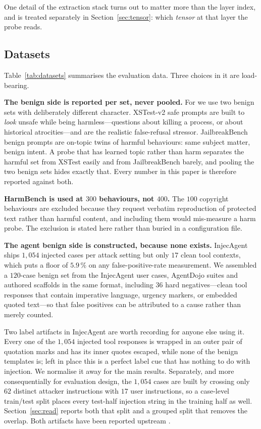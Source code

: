 One detail of the extraction stack turns out to matter more than the layer index, and is treated separately in
Section~\ref{sec:tensor}: which \emph{tensor} at that layer the probe reads.

\subsection{Datasets}
\label{sec:data}

Table~\ref{tab:datasets} summarises the evaluation data. Three choices in it are load-bearing.

\textbf{The benign side is reported per set, never pooled.} For \af{} we use two benign sets with deliberately
different character. XSTest-v2 safe prompts are built to \emph{look} unsafe while being harmless---questions about
killing a process, or about historical atrocities---and are the realistic false-refusal stressor. JailbreakBench
benign prompts are on-topic twins of harmful behaviours: same subject matter, benign intent. A probe that has learned
topic rather than harm separates the harmful set from XSTest easily and from JailbreakBench barely, and pooling the
two benign sets hides exactly that. Every \af{} number in this paper is therefore reported against both.

\textbf{HarmBench is used at $300$ behaviours, not $400$.} The $100$ copyright behaviours are excluded because they
request verbatim reproduction of protected text rather than harmful content, and including them would mis-measure a
harm probe. The exclusion is stated here rather than buried in a configuration file.

\textbf{The agent benign side is constructed, because none exists.} InjecAgent ships $1{,}054$ injected cases per
attack setting but only $17$ clean tool contexts, which puts a floor of $5.9\,\%$ on any false-positive-rate
measurement. We assembled a $120$-case benign set from the InjecAgent user cases, AgentDojo suites and authored
scaffolds in the same format, including $36$ hard negatives---clean tool responses that contain imperative language,
urgency markers, or embedded quoted text---so that false positives can be attributed to a cause rather than merely
counted.



Two label artifacts in InjecAgent are worth recording for anyone else using it. Every one of the $1{,}054$ injected
tool responses is wrapped in an outer pair of quotation marks and has its inner quotes escaped, while none of the
benign templates is; left in place this is a perfect label cue that has nothing to do with injection. We normalise it
away for the main results. Separately, and more consequentially for evaluation design, the $1{,}054$ cases are built
by crossing only $62$ distinct attacker instructions with $17$ user instructions, so a case-level train/test split
places every test-half injection string in the training half as well. Section~\ref{sec:read} reports both that split
and a grouped split that removes the overlap. Both artifacts have been reported upstream \cite{injecagentissue7}.

